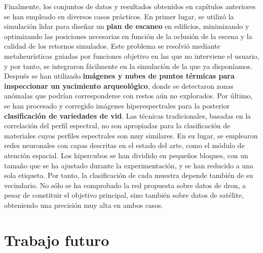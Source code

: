 Finalmente, los conjuntos de datos y resultados obtenidos en capítulos anteriores se han empleado en diversos casos prácticos. En primer lugar, se utilizó la simulación \acrshort{lidar} para diseñar un \textbf{plan de escaneo} en edificios, minimizando y optimizando las posiciones necesarias en función de la oclusión de la escena y la calidad de los retornos simulados. Este problema se resolvió mediante metaheurísticas guiadas por funciones objetivo en las que no interviene el usuario, y por tanto, se integraron fácilmente en la simulación de la que ya disponíamos. Después se han utilizado \textbf{imágenes y nubes de puntos térmicas para inspeccionar un yacimiento arqueológico}, donde se detectaron zonas anómalas que podrían corresponderse con restos aún no explorados. Por último, se han procesado y corregido imágenes hiperespectrales para la posterior \textbf{clasificación de variedades de vid}. Las técnicas tradicionales, basadas en la correlación del perfil espectral, no son apropiadas para la clasificación de materiales cuyos perfiles espectrales son muy similares. En su lugar, se emplearon redes neuronales con capas descritas en el estado del arte, como el módulo de atención espacial. Los hipercubos se han dividido en pequeños bloques, con un tamaño que se ha ajustado durante la experimentación, y se han reducido a una sola etiqueta. Por tanto, la clasificación de cada muestra depende también de su vecindario. No sólo se ha comprobado la red propuesta sobre datos de dron, a pesar de constituir el objetivo principal, sino también sobre datos de satélite, obteniendo una precisión muy alta en ambos casos. 

\section{Trabajo futuro}

